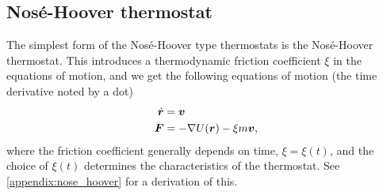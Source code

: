
\subsection{Nosé-Hoover thermostat}
The simplest form of the Nosé-Hoover type thermostats is the Nosé-Hoover thermostat. This introduces a thermodynamic friction coefficient $\xi$ in the equations of motion, and we get the following equations of motion (the time derivative noted by a dot)
\begin{align}
    \dot {\boldsymbol{r}} &= \boldsymbol{v} \label{eq:nose_hoover_velocity}\\
    \boldsymbol{F} &= -\nabla U(\boldsymbol{r}) - \xi m \boldsymbol{v}, \label{eq:nose_hoover_force}
\end{align}
where the friction coefficient generally depends on time, $\xi = \xi(t)$, and the choice of $\xi(t)$ determines the characteristics of the thermostat. See \cref{appendix:nose_hoover} for a derivation of this.

